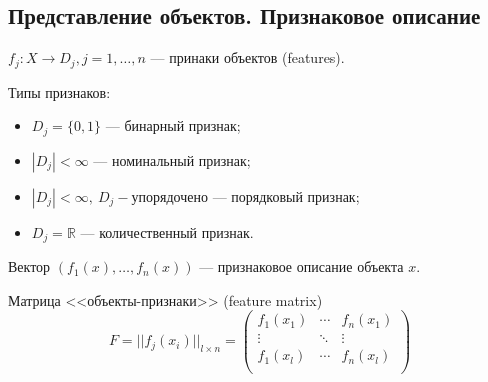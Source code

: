 \documentclass[compress]{beamer}
\begin{document}
\subsection{Представление объектов. Признаковое описание}
\begin{frame}
$f_j: X \rightarrow D_j, j=1,\dots,n$ --- принаки объектов (features).

Типы признаков:
\begin{itemize}
    \item $D_j = \{0, 1\}$ --- бинарный признак;
    \item $|D_j| < \infty$ --- номинальный признак;
    \item $|D_j| < \infty, ~ D_j - \text{упорядочено}$ --- порядковый признак;
    \item $D_j = \mathbb{R}$ --- количественный признак.
\end{itemize}

Вектор $\left(f_1(x),\dots,f_n(x)\right)$ --- признаковое описание объекта $x$.

Матрица <<объекты-признаки>> (feature matrix)
$$
F = ||f_j(x_i)||_{l \times n} = \begin{pmatrix}
    f_1(x_1) & \cdots & f_n(x_1) \\
    \vdots   & \ddots &   \vdots \\
    f_1(x_l) & \cdots & f_n(x_l) \\
    \end{pmatrix}
$$
\end{frame}
\end{document}
